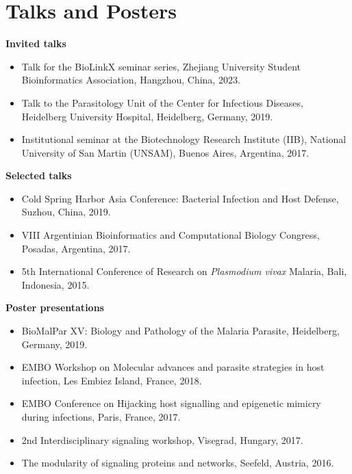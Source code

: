 \documentclass[11pt,a4paper,sans]{moderncv} %
\begin{document}
\vspace{0.5cm}

\section{Talks and Posters}
\vspace{-.1cm}
\textbf{Invited talks}
\begin{itemize}
  \item Talk for the BioLinkX seminar series, Zhejiang University Student Bioinformatics Association, Hangzhou, China, 2023.
  \item Talk to the Parasitology Unit of the Center for Infectious Diseases, Heidelberg University Hospital, Heidelberg, Germany, 2019.
  \item Institutional seminar at the Biotechnology Research Institute (IIB), National University of San Martin (UNSAM), Buenos Aires, Argentina, 2017.
\end{itemize}
\vspace{.1cm}
\textbf{Selected talks}
\begin{itemize}
  \item Cold Spring Harbor Asia Conference: Bacterial Infection and Host Defense, Suzhou, China, 2019.
  \item VIII Argentinian Bioinformatics and Computational Biology Congress, Posadas, Argentina, 2017.
  \item 5th International Conference of Research on \textit{Plasmodium vivax} Malaria, Bali, Indonesia, 2015.
\end{itemize}
\vspace{.1cm}
\textbf{Poster presentations}
\begin{itemize}
  \item BioMalPar XV: Biology and Pathology of the Malaria Parasite, Heidelberg, Germany, 2019.
  \item EMBO Workshop on Molecular advances and parasite strategies in host infection, Les Embiez Island, France, 2018.
  \item EMBO Conference on Hijacking host signalling and epigenetic mimicry during infections, Paris, France, 2017.
  \item 2nd Interdisciplinary signaling workshop, Visegrad, Hungary, 2017.
  \item The modularity of signaling proteins and networks, Seefeld, Austria, 2016.\\
\end{itemize}

\pagebreak
\end{document}
